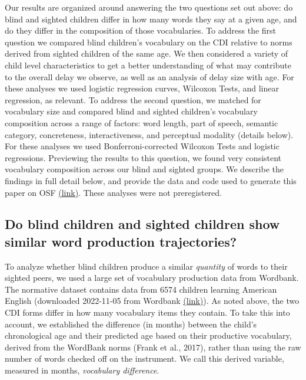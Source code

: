 \documentclass[english,man,floatsintext]{apa6}
\begin{document}
Our results are organized around answering the two questions set out above: do blind and sighted children differ in how many words they say at a given age, and do they differ in the composition of those vocabularies. To address the first question we compared blind children's vocabulary on the CDI relative to norms derived from sighted children of the same age. We then considered a variety of child level characteristics to get a better understanding of what may contribute to the overall delay we observe, as well as an analysis of delay size with age. For these analyses we used logistic regression curves, Wilcoxon Tests, and linear regression, as relevant. To address the second question, we matched for vocabulary size and compared blind and sighted children's vocabulary composition across a range of factors: word length, part of speech, semantic category, concreteness, interactiveness, and perceptual modality (details below). For these analyses we used Bonferroni-corrected Wilcoxon Tests and logistic regressions. Previewing the results to this question, we found very consistent vocabulary composition across our blind and sighted groups. We describe the findings in full detail below, and provide the data and code used to generate this paper on OSF \href{https://osf.io/uw6zm/?view_only=fdee466143f64d678d7f9d87b23ec566}{(link)}. These analyses were not preregistered.

\hypertarget{do-blind-children-and-sighted-children-show-similar-word-production-trajectories}{%
\subsection{Do blind children and sighted children show similar word production trajectories?}\label{do-blind-children-and-sighted-children-show-similar-word-production-trajectories}}

To analyze whether blind children produce a similar \emph{quantity} of words to their sighted peers, we used a large set of vocabulary production data from Wordbank. The normative dataset contains data from 6574 children learning American English (downloaded 2022-11-05 from Wordbank \href{http://wordbank.stanford.edu/data?name=vocab_norms}{(link)}). As noted above, the two CDI forms differ in how many vocabulary items they contain. To take this into account, we established the difference (in months) between the child's chronological age and their predicted age based on their productive vocabulary, derived from the WordBank norms (Frank et al., 2017), rather than using the raw number of words checked off on the instrument. We call this derived variable, measured in months, \emph{vocabulary difference}.
\end{document}
